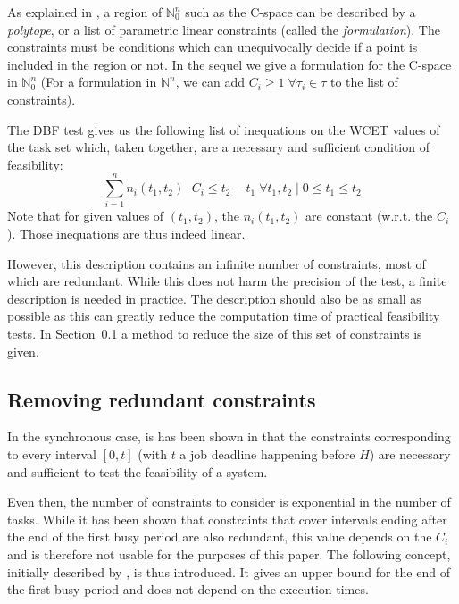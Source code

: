 \documentclass[conference]{IEEEtran}
\begin{document}
			As explained in \cite{nemhauser1988integer}, a region of $\mathbb{N}_0^n$
			such as the C-space can be described by a \emph{polytope}, or a list of
			parametric linear constraints (called the \emph{formulation}). The
			constraints must be conditions which can unequivocally decide if a point is
			included in the region or not. In the sequel we give a formulation for the
			C-space in $\mathbb{N}_0^n$ (For a formulation in $\mathbb{N}^n$, we can add
			$C_i \geqslant 1 \; \forall \tau_i \in \tau$ to the list of constraints).

		The DBF test gives us the following list of inequations on the WCET values of the task set
		which, taken together, are a necessary and sufficient condition of feasibility:
		\begin{equation}
			\sum_{i=1}^{n}  n_i(t_1, t_2) \cdot C_i \leq t_2 - t_1 \; \forall t_1,t_2 \mid 0 \leq t_1 \leq t_2
		\end{equation}
		Note that for given values  of $(t_1, t_2)$, the $n_i(t_1, t_2)$ are
		constant (w.r.t. the $C_i$). Those inequations are thus indeed linear.

      However, this description contains an infinite number of constraints, most of
      which are redundant. While this does not harm the precision of the
      test, a finite description is needed in practice. The description should also be as small as possible as this can greatly
      reduce the computation time of practical feasibility tests. In Section~\ref{sct:removeRedundancy} a method to reduce the size of this set of constraints is given.

  \subsection{Removing redundant constraints}
    \label{sct:removeRedundancy}

  In the synchronous case, is has been shown in \cite{baruah1990algorithms} that the constraints corresponding
  to every interval $[0, t]$ (with $t$ a job deadline happening before $H$) are
  necessary and sufficient to test the feasibility of a system.

  Even then, the number of constraints to consider is exponential in the number
  of tasks. While it has been shown \cite{baruah1990algorithms} that constraints that cover intervals ending
  after the end of the first busy period are also redundant, this value depends on the $C_i$ and is
  therefore not usable for the purposes of this paper. The
  following concept, initially described by \cite{lipariaverage}, is thus introduced. It gives an upper bound for the end of the first busy period and does not depend on the execution times.
\end{document}
